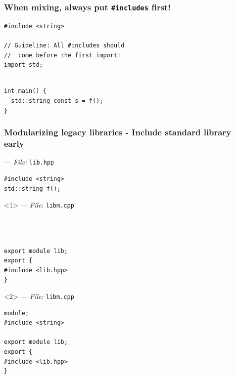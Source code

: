 \documentclass[aspectratio=169]{beamer}
\begin{document}
\begin{frame}[fragile]
  \frametitle{When mixing, always put \texttt{\#includes} first!}

  \begin{lstlisting}[style=cpp20]
#include <string>

// Guideline: All #includes should
//  come before the first import!
import std;
  \end{lstlisting}

  \begin{lstlisting}[style=cpp20]

int main() {
  std::string const s = f();
}
  \end{lstlisting}
\end{frame}

\begin{frame}[fragile]
  \frametitle{Modularizing legacy libraries - Include standard library early}
  --- \textit{File:} \texttt{lib.hpp}
  \begin{lstlisting}[style=cpp20]
#include <string>
std::string f();
  \end{lstlisting}

  \begin{onlyenv}<1>
  --- \textit{File:} \texttt{libm.cpp}
  \begin{lstlisting}[style=cpp20]



export module lib;
export {
#include <lib.hpp>
}
  \end{lstlisting}
  \end{onlyenv}

  \begin{onlyenv}<2>
  --- \textit{File:} \texttt{libm.cpp}
  \begin{lstlisting}[style=cpp20]
module;
#include <string>

export module lib;
export {
#include <lib.hpp>
}
  \end{lstlisting}
  \end{onlyenv}

\end{frame}
\end{document}
